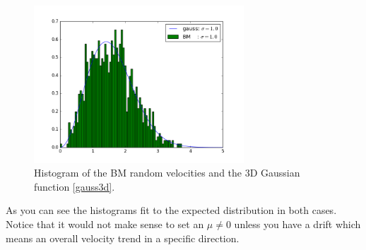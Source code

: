 \begin{figure}[ht]
	\centering
	\includegraphics[width=0.7\textwidth]{../dat/vel_hist.png}
	\caption{
		Histogram of the BM random velocities and the 3D Gaussian function \eqref{gauss3d}.
	}
	\label{velhist}
\end{figure}

As you can see the histograms fit to the expected distribution in both cases.\\

Notice that it would not make sense to set an $\mu\neq 0$ unless you have a drift which means an overall velocity trend in a specific direction. 

\FloatBarrier